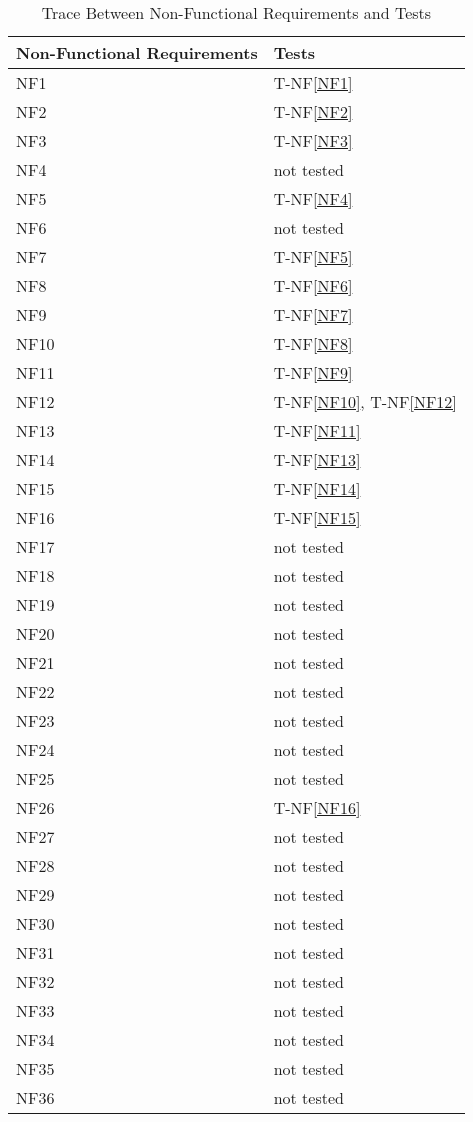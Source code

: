 \documentclass[12pt, titlepage]{article}
\newcommand{\nfref}[1]{T-NF\ref{#1}}
\begin{document}
\begin{table}[H]
\centering
\begin{tabular}{p{} p{}}
\toprule
\textbf{Non-Functional Requirements} & \textbf{Tests}\\
\midrule
NF1 & \nfref{NF1}\\
NF2 & \nfref{NF2}\\
NF3 & \nfref{NF3}\\
NF4 & not tested\\
NF5 & \nfref{NF4}\\
NF6 & not tested\\
NF7 & \nfref{NF5}\\
NF8 & \nfref{NF6}\\
NF9 & \nfref{NF7}\\
NF10 & \nfref{NF8}\\
NF11 & \nfref{NF9}\\
NF12 & \nfref{NF10}, \nfref{NF12}\\
NF13 & \nfref{NF11}\\
NF14 & \nfref{NF13}\\
NF15 & \nfref{NF14}\\
NF16 & \nfref{NF15}\\
NF17 &  not tested\\
NF18 &  not tested\\
NF19 &  not tested\\
NF20 &  not tested\\
NF21 &  not tested\\
NF22 &  not tested\\
NF23 &  not tested\\
NF24 &  not tested\\
NF25 &  not tested\\
NF26 &  \nfref{NF16}\\
NF27 &  not tested\\
NF28 &  not tested\\
NF29 &  not tested\\
NF30 &  not tested\\
NF31 &  not tested\\
NF32 &  not tested\\
NF33 &  not tested\\
NF34 &  not tested\\
NF35 &  not tested\\
NF36 &  not tested\\
\bottomrule
\end{tabular}
\caption{Trace Between Non-Functional Requirements and Tests}
\label{TblRT}
\end{table}
\end{document}
